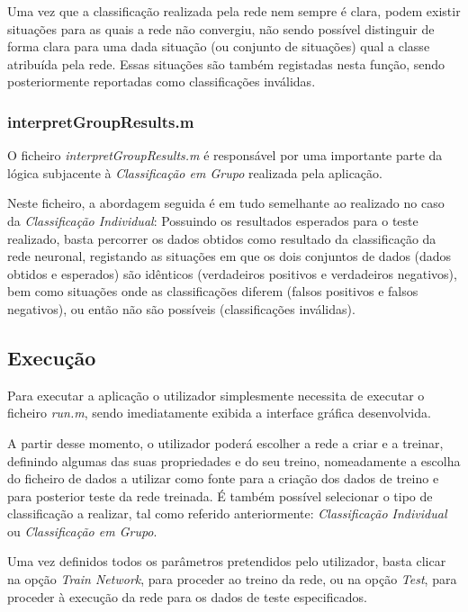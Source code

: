 \documentclass{article}
\begin{document}
Uma vez que a classificação realizada pela rede nem sempre é clara, podem existir situações para as quais a rede não convergiu, não sendo possível distinguir de forma clara para uma dada situação (ou conjunto de situações) qual a classe atribuída pela rede. Essas situações são também registadas nesta função, sendo posteriormente reportadas como classificações inválidas.

\subsubsection{interpretGroupResults.m}

O ficheiro \emph{interpretGroupResults.m} é responsável por uma importante parte da lógica subjacente à \emph{Classificação em Grupo} realizada pela aplicação.

Neste ficheiro, a abordagem seguida é em tudo semelhante ao realizado no caso da \emph{Classificação Individual}: Possuindo os resultados esperados para o teste realizado, basta percorrer os dados obtidos como resultado da classificação da rede neuronal, registando as situações em que os dois conjuntos de dados (dados obtidos e esperados) são idênticos (verdadeiros positivos e verdadeiros negativos), bem como situações onde as classificações diferem (falsos positivos e falsos negativos), ou então não são possíveis (classificações inválidas).

\subsection{Execução}

Para executar a aplicação o utilizador simplesmente necessita de executar o ficheiro \emph{run.m}, sendo imediatamente exibida a interface gráfica desenvolvida.

A partir desse momento, o utilizador poderá escolher a rede a criar e a treinar, definindo algumas das suas propriedades e do seu treino, nomeadamente a escolha do ficheiro de dados a utilizar como fonte para a criação dos dados de treino e para posterior teste da rede treinada. É também possível selecionar o tipo de classificação a realizar, tal como referido anteriormente: \emph{Classificação Individual} ou \emph{Classificação em Grupo}.

Uma vez definidos todos os parâmetros pretendidos pelo utilizador, basta clicar na opção \emph{Train Network}, para proceder ao treino da rede, ou na opção \emph{Test}, para proceder à execução da rede para os dados de teste especificados.
\end{document}
